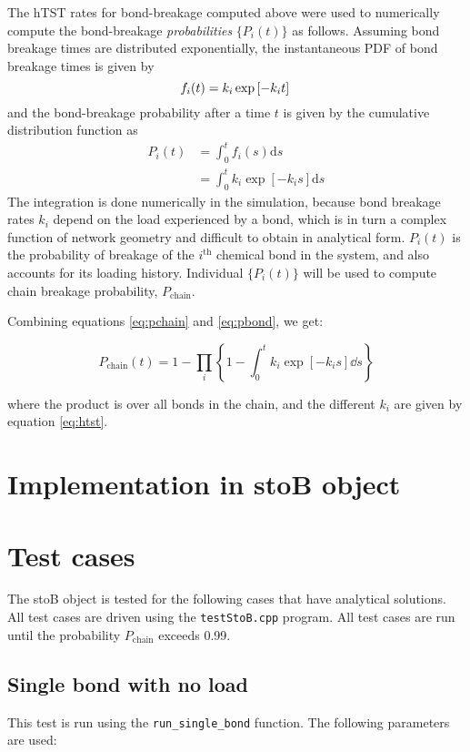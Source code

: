 \documentclass[letterpaper]{article}
\begin{document}
The hTST rates for bond-breakage computed above were used to numerically compute the bond-breakage \emph{probabilities} $\{P_i(t)\}$ as follows. Assuming bond breakage times are distributed exponentially, the instantaneous PDF of bond breakage times is given by
%
\begin{equation}
f_i(t) = k_{i}\exp\left[{-k_it}\right]\\
\end{equation}
%
and the bond-breakage probability after a time $t$ is given by the cumulative distribution function as
\begin{align}
P_i(t) &= \int_0^tf_i(s)\mathrm{d}s \nonumber\\
       &= \int_0^tk_{i}\exp\left[{-k_is}\right]\mathrm{d}s \label{eq:pbond}
\end{align}
%
The integration is done numerically in the simulation, because bond breakage rates $k_i$ depend on the load experienced by a bond, which is in turn a complex function of network geometry and difficult to obtain in analytical form. $P_i(t)$ is the probability of breakage of the $i^\mathrm{th}$ chemical bond in the system, and also accounts for its loading history. Individual $\{P_i(t)\}$ will be used to compute chain breakage probability, $P_\mathrm{chain}$.

Combining equations \ref{eq:pchain} and \ref{eq:pbond}, we get:

\begin{equation}\label{eq:main}
  P_\mathrm{chain}(t) = 1 - \prod_i{ \left\lbrace{ 1- \int_0^t{k_i\exp[-k_i s]\dd{s}}
  }\right\rbrace}
\end{equation}

where the product is over all bonds in the chain, and the different $k_i$ are given by equation \ref{eq:htst}.

\section{Implementation in stoB object}

\section{Test cases}
The stoB object is tested for the following cases that have analytical solutions. All test cases are driven using the \texttt{testStoB.cpp} program.  All test cases are run until the probability $P_\mathrm{chain}$ exceeds 0.99.

\subsection{Single bond with no load}
This test is run using the \texttt{run\_single\_bond} function. The following parameters are used:
\end{document}
